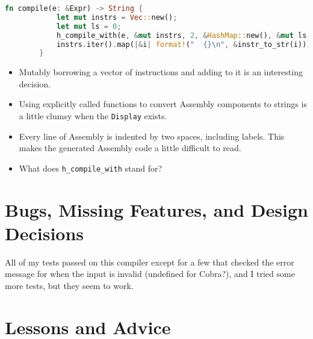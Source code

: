 	\begin{lstlisting}[language=Rust, title=Code for compiling \texttt{Expr} into an string of Assembly instructions]
		fn compile(e: &Expr) -> String {
		    let mut instrs = Vec::new();
		    let mut ls = 0;
		    h_compile_with(e, &mut instrs, 2, &HashMap::new(), &mut ls, None);
		    instrs.iter().map(|&i| format!("  {}\n", &instr_to_str(i))).fold(String::new(), |acc, s| acc + &s)
		}
	\end{lstlisting}
	\begin{itemize}
		\item Mutably borrowing a vector of instructions and adding to it is an interesting decision.
		\item Using explicitly called functions to convert Assembly components to strings is a little clumsy when the \verb|Display| exists.
		\item Every line of Assembly is indented by two spaces, including labels. This makes the generated Assembly code a little difficult to read.
		\item What does \verb|h_compile_with| stand for?
	\end{itemize}

	\section{Bugs, Missing Features, and Design Decisions}

	All of my tests passed on this compiler except for a few that checked the error message for when the input is invalid (undefined for Cobra?), and I tried some more tests, but they seem to work.

	\section{Lessons and Advice}

